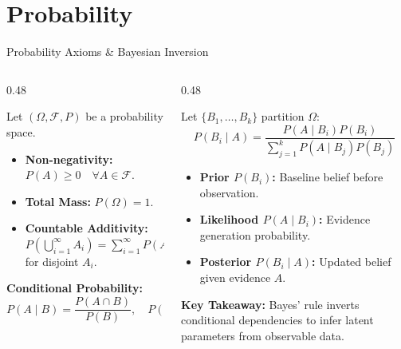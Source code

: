 \documentclass[aspectratio=169, 9pt]{beamer}
\begin{document}
\section{Probability}
\begin{frame}{Probability Axioms \& Bayesian Inversion}
    \begin{columns}[t]
        \begin{column}{0.48\textwidth}
            \par\vspace{0.2em}
            \scriptsize
            Let $(\Omega, \mathcal{F}, P)$ be a probability space.
            \begin{itemize}\setlength{\itemsep}{2pt}
                \item \textbf{Non-negativity:} $P(A) \ge 0 \quad \forall A \in \mathcal{F}$.
                \item \textbf{Total Mass:} $P(\Omega) = 1$.
                \item \textbf{Countable Additivity:} $P\left(\bigcup_{i=1}^\infty A_i\right) = \sum_{i=1}^\infty P(A_i)$ for disjoint $A_i$.
            \end{itemize}
            \vspace{0.2em}
            \textbf{Conditional Probability:}
            \begin{equation*}
                P(A \mid B) = \frac{P(A \cap B)}{P(B)}, \quad P(B) > 0
            \end{equation*}
        \end{column}
        \begin{column}{0.48\textwidth}
            \par\vspace{0.2em}
            \scriptsize
            Let $\{B_1, \dots, B_k\}$ partition $\Omega$:
            \begin{equation*}
                P(B_i \mid A) = \frac{P(A \mid B_i) P(B_i)}{\sum_{j=1}^k P(A \mid B_j) P(B_j)}
            \end{equation*}
            \vspace{0.1em}
            \begin{itemize}\setlength{\itemsep}{2pt}
                \item \textbf{Prior $P(B_i)$:} Baseline belief before observation.
                \item \textbf{Likelihood $P(A \mid B_i)$:} Evidence generation probability.
                \item \textbf{Posterior $P(B_i \mid A)$:} Updated belief given evidence $A$.
            \end{itemize}
            \vspace{0.2em}
            \begin{takeaway}
                \textbf{Key Takeaway:} Bayes' rule inverts conditional dependencies to infer latent parameters from observable data.
            \end{takeaway}
        \end{column}
    \end{columns}
\end{frame}
\end{document}
